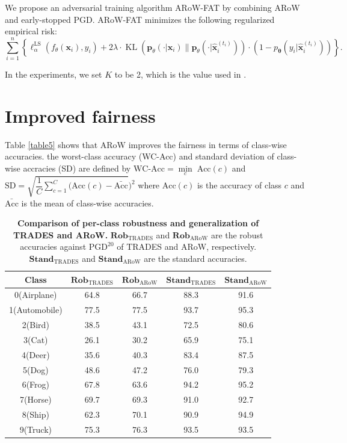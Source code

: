 \documentclass[nohyperref]{article}
\theoremstyle{plain}
\theoremstyle{definition}
\theoremstyle{remark}
\begin{document}
We propose an adversarial training algorithm ARoW-FAT by combining ARoW and early-stopped PGD. ARoW-FAT minimizes the following regularized empirical risk:
\begin{equation*}
\label{arow-fat}
    \sum\limits_{i=1}^n \left\{ \ell^{\text{LS}}_{\alpha}(f_{\theta}(\bm{x}_i), y_i) +  2 \lambda \cdot \operatorname{KL} (\mathbf{p}_{\theta }(\cdot|\bm{x}_i)\lVert \mathbf{p}_{\theta }(\cdot|\widehat{\bm{x}}^{(t_i)}_i)) \cdot  (1 - p_{\bm{\theta}}(y_i | \widehat{\bm{x}}^{(t_i)}_i)) \right\}.
\end{equation*}

In the experiments, we set $K$ to be 2,  which is the value used in \cite{zhang2020attacks}. 

\section{Improved fairness}
\label{appE}

Table \ref{table5} shows that ARoW improves the fairness in terms of class-wise accuracies.
the worst-class accuracy (WC-Acc) and standard deviation of class-wise accracies (SD) are defined by $\text{WC-Acc} = \underset{c}{\min}\; \text{Acc}(c)$ and $\text{SD} = \sqrt{\dfrac{1}{C}\sum\limits_{c=1}^C (\text{Acc}(c)-\bar{\text{Acc}}})^2$
where $\text{Acc}(c)$ is the accuracy of class $c$ and $\bar{\text{Acc}}$ is the mean of class-wise accuracies.

\begin{table}[H]
    \caption{\textbf{Comparison of per-class robustness and generalization of TRADES and ARoW.} $\textbf{Rob}_{\text{TRADES}}$ and $\textbf{Rob}_{\text{ARoW}}$ are the robust accuracies against $\text{PGD}^{20}$ of TRADES and ARoW, respectively. $\textbf{Stand}_{\text{TRADES}}$ and $\textbf{Stand}_{\text{ARoW}}$ are the standard accuracies.}
    \centering
    \begin{tabular}{c|cccc}
    \hline
    \textbf{Class} & $\textbf{Rob}_{\text{TRADES}}$ & $\textbf{Rob}_{\text{ARoW}}$ &  $\textbf{Stand}_{\text{TRADES}}$ &  $\textbf{Stand}_{\text{ARoW}}$ \\
    \hline
    \hline
    0(Airplane)    & 64.8 & 66.7 & 88.3 & 91.6 \\
    1(Automobile)  & 77.5 & 77.5 & 93.7 & 95.3 \\
    2(Bird)        & 38.5 & 43.1 & 72.5 & 80.6 \\
    3(Cat)         & 26.1 & 30.2 & 65.9 & 75.1 \\
    4(Deer)        & 35.6 & 40.3 & 83.4 & 87.5 \\
    5(Dog)         & 48.6 & 47.2 & 76.0 & 79.3 \\
    6(Frog)        & 67.8 & 63.6 & 94.2 & 95.2 \\
    7(Horse)       & 69.7 & 69.3 & 91.0 & 92.7 \\
    8(Ship)        & 62.3 & 70.1 & 90.9 & 94.9 \\
    9(Truck)       & 75.3 & 76.3 & 93.5 & 93.5 \\
    \hline
    \end{tabular}
    \label{per-class-comparison}
\end{table}
\end{document}
